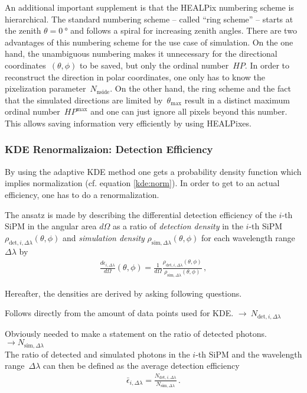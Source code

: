 An additional important supplement is that the HEALPix numbering scheme is hierarchical. The standard numbering scheme -- called \enquote{ring scheme} -- starts at the zenith $\theta = \SI{0}{\degree}$ and follows a spiral for increasing zenith angles. There are two advantages of this numbering scheme for the use case of \iceact simulation. On the one hand, the unambiguous numbering makes it unnecessary for the directional coordinates~$(\theta, \phi)$ to be saved, but only the ordinal number~$HP$. In order to reconstruct the direction in polar coordinates, one only has to know the pixelization parameter~$N_\text{nside}$. On the other hand, the ring scheme and the fact that the simulated directions are limited by~$\theta_\text{max}$ result in a distinct maximum ordinal number~$HP^\text{max}$ and one can just ignore all pixels beyond this number. This allows saving information very efficiently by using HEALPixes. 

\subsubsection{KDE Renormalizaion: Detection Efficiency}

By using the adaptive KDE method one gets a probability density function which implies normalization (cf. equation \eqref{kde:norm}). In order to get to an actual efficiency, one has to do a renormalization.

The ansatz is made by describing the differential detection efficiency of the $i$-th SiPM in the angular area $d\Omega$ as a ratio of \textit{detection density} in the $i$-th SiPM $\rho_{\text{det},i,\Delta\lambda}(\theta,\phi)$ and \textit{simulation density} $\rho_{\text{sim},\Delta\lambda}(\theta,\phi)$ for each wavelength range $\Delta\lambda$ by
\begin{align}
\frac{d\epsilon_{i,\Delta\lambda}}{d\Omega}(\theta,\phi) = \frac{1}{d\Omega} \frac{\rho_{\text{det},i,\Delta\lambda}(\theta,\phi)}{\rho_{\text{sim},\Delta\lambda}(\theta,\phi)}\,,
\end{align}

Hereafter, the densities are derived by asking following questions.

Follows directly from the amount of data points used for KDE. $\rightarrow~N_{\text{det},i,\Delta\lambda}$

Obviously needed to make a statement on the ratio of detected photons. $\rightarrow N_{\text{sim},\Delta\lambda}$\\
The ratio of detected and simulated photons in the $i$-th SiPM and the wavelength range~$\Delta\lambda$ can then be defined as the average detection efficiency 
\begin{align}
	\bar{\epsilon}_{i,\Delta\lambda} = \frac{N_{\text{det},i,\Delta\lambda}}{N_{\text{sim},\Delta\lambda}}\,.
\end{align}


